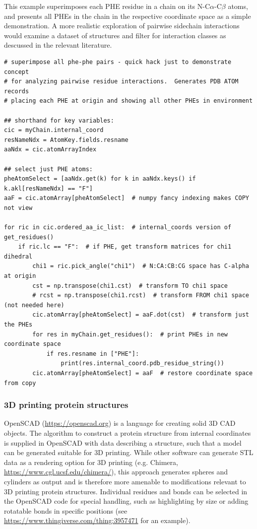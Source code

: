 This example superimposes each PHE residue in a chain on its N-C$\alpha$-C$\beta$ atoms,
and presents all PHEs in the chain in the respective coordinate space as a simple demonstration.
A more realistic exploration of pairwise sidechain interactions would examine a dataset of
structures and filter for interaction classes as descussed in the relevant literature.

\begin{verbatim}
# superimpose all phe-phe pairs - quick hack just to demonstrate concept
# for analyzing pairwise residue interactions.  Generates PDB ATOM records
# placing each PHE at origin and showing all other PHEs in environment

## shorthand for key variables:
cic = myChain.internal_coord
resNameNdx = AtomKey.fields.resname
aaNdx = cic.atomArrayIndex

## select just PHE atoms:
pheAtomSelect = [aaNdx.get(k) for k in aaNdx.keys() if k.akl[resNameNdx] == "F"]
aaF = cic.atomArray[pheAtomSelect]  # numpy fancy indexing makes COPY not view

for ric in cic.ordered_aa_ic_list:  # internal_coords version of get_residues()
    if ric.lc == "F":  # if PHE, get transform matrices for chi1 dihedral
        chi1 = ric.pick_angle("chi1")  # N:CA:CB:CG space has C-alpha at origin
        cst = np.transpose(chi1.cst)  # transform TO chi1 space
        # rcst = np.transpose(chi1.rcst)  # transform FROM chi1 space (not needed here)
        cic.atomArray[pheAtomSelect] = aaF.dot(cst)  # transform just the PHEs
        for res in myChain.get_residues():  # print PHEs in new coordinate space
            if res.resname in ["PHE"]:
                print(res.internal_coord.pdb_residue_string())
        cic.atomArray[pheAtomSelect] = aaF  # restore coordinate space from copy
\end{verbatim}

\subsubsection{3D printing protein structures}

OpenSCAD (\url{https://openscad.org}) is a language for creating solid 3D CAD objects.  
The algorithm to construct a protein structure from internal coordinates is supplied
in OpenSCAD with data describing a structure, such that a model can be generated suitable
for 3D printing.  While other software can generate STL data as a rendering option for
3D printing (e.g. Chimera, \url{https://www.cgl.ucsf.edu/chimera/}), this approach generates
spheres and cylinders as output and is therefore more amenable to modifications relevant to
3D printing protein structures.  Individual residues and bonds can be selected
in the OpenSCAD code for special handling, such as highlighting by size or adding
rotatable bonds in specific positions (see \url{https://www.thingiverse.com/thing:3957471}
for an example).

